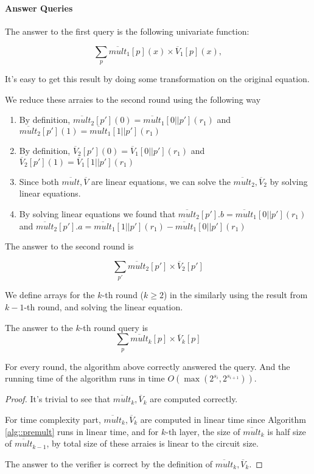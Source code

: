 \paragraph{Answer Queries}
The answer to the first query is the following univariate function:

$$\sum_{p}\overline{mult}_1[p](x)\times\overline{V}_1[p](x),$$

It's easy to get this result by doing some transformation on the original equation.

We reduce these arraies to the second round using the following way

\begin{enumerate}
	\item By definition, $\overline{mult}_2[p'](0)=\overline{mult}_1[0||p'](r_1)$ and $\overline{mult}_2[p'](1)=\overline{mult}_1[1||p'](r_1)$
	\item By definition, $\overline{V}_2[p'](0)=\overline{V}_1[0||p'](r_1)$ and $\overline{V}_2[p'](1)=\overline{V}_1[1||p'](r_1)$

	\item Since both $\overline{mult}, \overline{V}$ are linear equations, we can solve the $\overline{mult}_2, \overline{V}_2$ by solving linear equations.
	\item By solving linear equations we found that $\overline{mult}_2[p'].b=\overline{mult}_1[0||p'](r_1)$ and $\overline{mult}_2[p'].a=\overline{mult}_1[1||p'](r_1)-\overline{mult}_1[0||p'](r_1)$
\end{enumerate}

The answer to the second round is 

$$\sum_{p'}\overline{mult}_2[p']\times\overline{V}_2[p']$$

We define arrays for the $k$-th round ($k\ge 2$) in the similarly using the result from $k-1$-th round, and solving the linear equation.

The answer to the $k$-th round query is 
$$\sum_{p}\overline{mult}_k[p]\times\overline{V}_k[p]$$

\begin{theorem} For every round, the algorithm above correctly answered the query. And the running time of the algorithm runs in time $O(\max(2^{s_i}, 2^{s_{i+1}}))$.
\end{theorem}

\begin{proof}
It's trivial to see that $\overline{mult}_k, \overline{V}_k$ are computed correctly. 

For time complexity part, $\overline{mult}_k, \overline{V}_k$ are computed in linear time since Algorithm \ref{alg::premult} runs in linear time, and for $k$-th layer, the size of $\overline{mult}_k$ is half size of $\overline{mult}_{k-1}$, by total size of these arraies is linear to the circuit size.

The answer to the verifier is correct by the definition of $\overline{mult}_k, \overline{V}_k$.
\end{proof}

